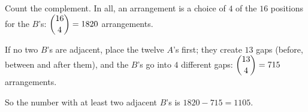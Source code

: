 Count the complement. In all, an arrangement is a choice of $4$ of the $16$ positions for the $B$'s: $\dbinom{16}{4}=1820$ arrangements.

If no two $B$'s are adjacent, place the twelve $A$'s first; they create $13$ gaps (before, between and after them), and the $B$'s go into $4$ different gaps: $\dbinom{13}{4}=715$ arrangements.

So the number with at least two adjacent $B$'s is $1820-715=\boxed{1105}$.

